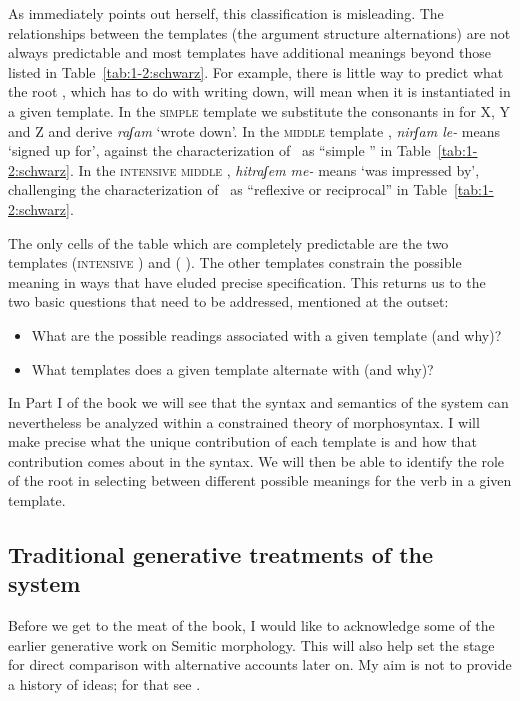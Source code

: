 \begin{exe}
\begin{xlist}
\begin{exe}
\begin{exe}
\begin{exe}
\begin{exe}
\begin{xlist}
\begin{exe}
\begin{xlist}
\begin{xlist}
\begin{xlist}
\begin{exe}
\begin{xlist}
As \citeauthor{schwarzwald81} immediately points out herself, this classification is misleading. The relationships between the templates (the argument structure alternations) are not always predictable and most templates have additional meanings beyond those listed in Table~\ref{tab:1-2:schwarz}. For example, there is little way to predict what the root , which has to do with writing down, will mean when it is instantiated in a given template. In the \textsc{simple} template {\tkal} we substitute the consonants in  for X, Y and Z and derive \emph{raʃam} `wrote down'. In the \textsc{middle} template \tnif, \emph{nirʃam le-} means `signed up for', against the characterization of \tnif~as ``simple '' in Table~\ref{tab:1-2:schwarz}. In the \textsc{intensive middle} \thit, \emph{hitraʃem me-} means `was impressed by', challenging the characterization of \thit~as ``reflexive or reciprocal'' in Table~\ref{tab:1-2:schwarz}. 

The only cells of the table which are completely predictable are the two  templates {\tpua} (\textsc{intensive }) and {\thuf} (\textsc{ }). The other templates constrain the possible meaning in ways that have eluded precise specification. This returns us to the two basic questions that need to be addressed, mentioned at the outset:
\begin{itemize}
	\item What are the possible readings associated with a given template (and why)?
	\item What templates does a given template alternate with (and why)?
\end{itemize}

In Part I of the book we will see that the syntax and semantics of the system can nevertheless be analyzed within a constrained theory of morphosyntax. I will make precise what the unique contribution of each template is and how that contribution comes about in the syntax. We will then be able to identify the role of the root in selecting between different possible meanings for the verb in a given template.


	\subsection{Traditional generative treatments of the system} \label{intro:basic:jjmcc}
Before we get to the meat of the book, I would like to acknowledge some of the earlier generative work on Semitic morphology. This will also help set the stage for direct comparison with alternative accounts later on. My aim is not to provide a history of ideas; for that see \cite{kastnertucker19cup}.


\end{xlist}
\end{exe}
\end{xlist}
\end{xlist}
\end{xlist}
\end{exe}
\end{xlist}
\end{exe}
\end{exe}
\end{exe}
\end{exe}
\end{xlist}
\end{exe}
